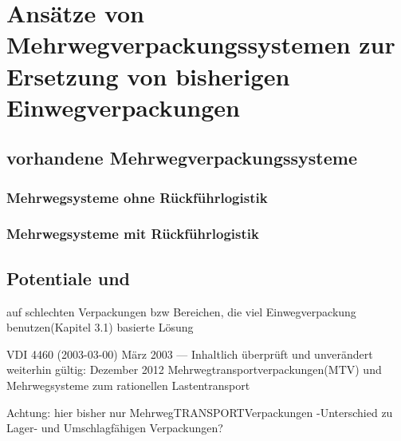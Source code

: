 
\chapter{Ansätze von Mehrwegverpackungssystemen zur Ersetzung von bisherigen Einwegverpackungen}
\label{sec:Ansätze}

\section{vorhandene Mehrwegverpackungssysteme}
\label{sec:Ansätze: Pfand-System}

\subsection{Mehrwegsysteme ohne Rückführlogistik}
\label{System ohne Rückführlogistik}

\subsection{Mehrwegsysteme mit Rückführlogistik}
\label{System mit Rückführlogistik}



\section{Potentiale und }
\label{sec:Ansätze von Mehrwegverpackungssystemen zur Ersetzung von bisherigen Einwegverpackungen:}

    auf schlechten Verpackungen bzw Bereichen, die viel Einwegverpackung benutzen(Kapitel 3.1) basierte Lösung
    
    



VDI 4460 (2003-03-00) März 2003 --- Inhaltlich überprüft und unverändert weiterhin gültig: Dezember 2012
Mehrwegtransportverpackungen(MTV) und Mehrwegsysteme zum rationellen Lastentransport

Achtung: hier bisher nur MehrwegTRANSPORTVerpackungen
    -Unterschied zu Lager- und Umschlagfähigen Verpackungen?

